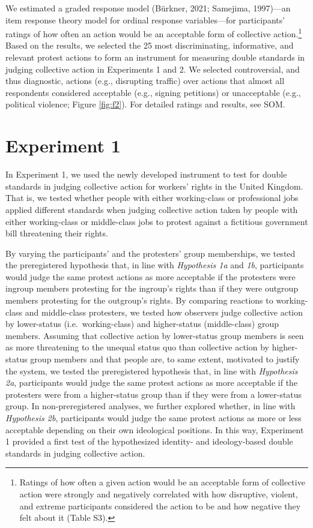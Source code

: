 \documentclass[twocolumn, 11pt, letterpaper]{article}
\begin{document}
We estimated a graded response model (Bürkner, 2021; Samejima,
1997)---an item response theory model for ordinal response
variables---for participants' ratings of how often an action would be an
acceptable form of collective action.\footnote{Ratings of how often a
  given action would be an acceptable form of collective action were
  strongly and negatively correlated with how disruptive, violent, and
  extreme participants considered the action to be and how negative they
  felt about it (Table S3).} Based on the results, we selected the 25
most discriminating, informative, and relevant protest actions to form
an instrument for measuring double standards in judging collective
action in Experiments 1 and 2. We selected controversial, and thus
diagnostic, actions (e.g., disrupting traffic) over actions that almost
all respondents considered acceptable (e.g., signing petitions) or
unacceptable (e.g., political violence; Figure \ref{fig:f2}). For
detailed ratings and results, see SOM.

\hypertarget{experiment-1}{%
\section{Experiment 1}\label{experiment-1}}

In Experiment 1, we used the newly developed instrument to test for
double standards in judging collective action for workers' rights in the
United Kingdom. That is, we tested whether people with either
working-class or professional jobs applied different standards when
judging collective action taken by people with either working-class or
middle-class jobs to protest against a fictitious government bill
threatening their rights.

By varying the participants' and the protesters' group memberships, we
tested the preregistered hypothesis that, in line with \emph{Hypothesis
1a} and \emph{1b}, participants would judge the same protest actions as
more acceptable if the protesters were ingroup members protesting for
the ingroup's rights than if they were outgroup members protesting for
the outgroup's rights. By comparing reactions to working-class and
middle-class protesters, we tested how observers judge collective action
by lower-status (i.e.~working-class) and higher-status (middle-class)
group members. Assuming that collective action by lower-status group
members is seen as more threatening to the unequal status quo than
collective action by higher-status group members and that people are, to
same extent, motivated to justify the system, we tested the
preregistered hypothesis that, in line with \emph{Hypothesis 2a},
participants would judge the same protest actions as more acceptable if
the protesters were from a higher-status group than if they were from a
lower-status group. In non-preregistered analyses, we further explored
whether, in line with \emph{Hypothesis 2b}, participants would judge the
same protest actions as more or less acceptable depending on their own
ideological positions. In this way, Experiment 1 provided a first test
of the hypothesized identity- and ideology-based double standards in
judging collective action.
\end{document}
